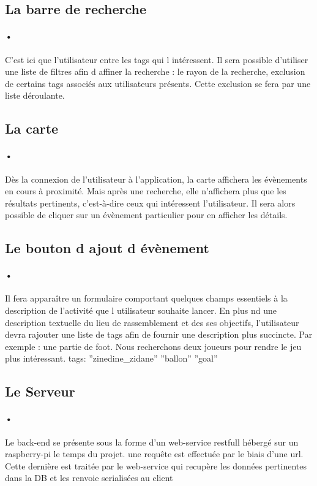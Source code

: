 \documentclass[pdftex,12pt,a4paper]{article}
\begin{document}
\subsection{La barre de recherche}
\paragraph{•}
C'est ici que l'utilisateur entre les tags qui l int\'eressent. Il sera possible d'utiliser une liste de filtres afin d affiner la recherche : le rayon de la recherche, exclusion de certains tags associ\'es aux utilisateurs pr\'esents. Cette exclusion se fera par une liste déroulante.

\subsection{La carte}
\paragraph{•}
D\`es la connexion de l'utilisateur \`a l'application, la carte affichera les \'ev\`enements en cours \`a proximit\'e. Mais apr\`es une recherche, elle n'affichera plus que les r\'esultats pertinents, c’est-à-dire ceux qui int\'eressent l'utilisateur. Il sera alors possible de cliquer sur un \'ev\`enement particulier pour en afficher les d\'etails. 

\subsection{Le bouton d ajout d \'ev\`enement}
\paragraph{•}
Il fera appara\^itre un formulaire comportant quelques champs essentiels à la description de l'activit\'e que l utilisateur souhaite lancer. En plus nd une description textuelle du lieu de rassemblement et des ses objectifs, l'utilisateur devra rajouter une liste de tags afin de fournir une description plus succincte.
Par exemple : une partie de foot. Nous recherchons deux joueurs pour rendre le jeu plus int\'eressant. tags: ''zinedine\_zidane'' ''ballon'' ''goal''

\subsection{Le Serveur}
\paragraph{•}
Le back-end se pr\'esente sous la forme d'un web-service restfull h\'eberg\'e sur un raspberry-pi le temps du projet.
une requ\^ete est effectu\'ee par le biais d'une url. Cette derni\`ere est trait\'ee par le web-service 
qui recup\`ere les donn\'ees pertinentes dans la DB et les renvoie serialis\'ees au client
\end{document}
